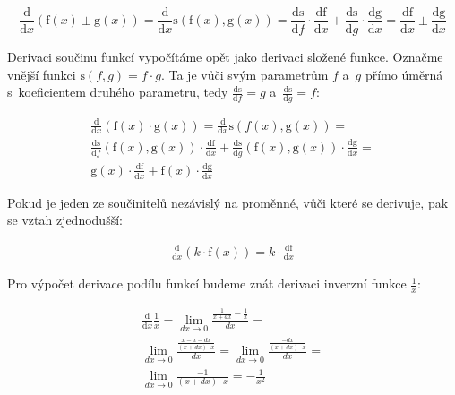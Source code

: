 \begin{equation}
\frac{\mathrm{d}}{\mathrm{d}x} (\mathrm{f}(x) \pm \mathrm{g}(x)) = \frac{\mathrm{d}}{\mathrm{d}x} \mathrm{s}(\mathrm{f}(x), \mathrm{g}(x)) = \frac{\mathrm{ds}}{\mathrm{d}f} \cdot \frac{\mathrm{df}}{\mathrm{d}x} + \frac{\mathrm{ds}}{\mathrm{d}g} \cdot \frac{\mathrm{dg}}{\mathrm{d}x} = \frac{\mathrm{df}}{\mathrm{d}x} \pm \frac{\mathrm{dg}}{\mathrm{d}x}
\end{equation}

Derivaci součinu funkcí vypočítáme opět jako derivaci složené funkce. Označme vnější funkci \(\mathrm{s}(f, g) = f \cdot g\). Ta je vůči svým parametrům \(f\) a~\(g\) přímo úměrná s~koeficientem druhého parametru, tedy \(\frac{\mathrm{ds}}{\mathrm{d}f} = g\) a~\(\frac{\mathrm{ds}}{\mathrm{d}g} = f\):

\begin{equation}
\begin{split}
\frac{\mathrm{d}}{\mathrm{d}x} (\mathrm{f}(x) \cdot \mathrm{g}(x)) = \frac{\mathrm{d}}{\mathrm{d}x} \mathrm{s}({f}(x), \mathrm{g}(x)) = \\
\frac{\mathrm{ds}}{\mathrm{d}f} (\mathrm{f}(x), \mathrm{g}(x)) \cdot \frac{\mathrm{df}}{\mathrm{d}x} + \frac{\mathrm{ds}}{\mathrm{d}g}(\mathrm{f}(x), \mathrm{g}(x)) \cdot \frac{\mathrm{dg}}{\mathrm{d}x} = \\
\mathrm{g}(x) \cdot \frac{\mathrm{df}}{\mathrm{d}x} + \mathrm{f}(x) \cdot \frac{\mathrm{dg}}{\mathrm{d}x}
\end{split}
\end{equation}

Pokud je jeden ze součinitelů nezávislý na proměnné, vůči které se derivuje, pak se vztah zjednodušší:

\begin{equation}
\begin{split}
\frac{\mathrm{d}}{\mathrm{d}x} (k \cdot \mathrm{f}(x)) = k \cdot \frac{\mathrm{df}}{\mathrm{d}x}
\end{split}
\end{equation}

Pro výpočet derivace podílu funkcí budeme znát derivaci inverzní funkce \(\frac{1}{x}\):

\begin{equation}
\begin{split}
\frac{\mathrm{d}}{\mathrm{d}x} \frac{1}{x} = \lim_{dx \to 0} \frac{\frac{1}{x + dx} - \frac{1}{x}}{dx} = \\
\lim_{dx \to 0} \frac{\frac{x - x - dx}{(x + dx) \cdot x}}{dx} = \lim_{dx \to 0} \frac{\frac{-dx}{(x + dx) \cdot x}}{dx} = \\
\lim_{dx \to 0} \frac{-1}{(x + dx) \cdot x} = -\frac{1}{x^2}
\end{split}
\end{equation}

